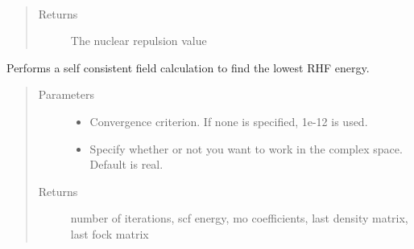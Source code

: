 \documentclass[letterpaper,10pt,english]{sphinxmanual}
\begin{document}
\begin{fulllineitems}
\begin{fulllineitems}
\begin{quote}
\begin{description}
\end{description}\end{quote}

\end{fulllineitems}


\begin{fulllineitems}
\label{\detokenize{RHF:hf.HartreeFock.RHF.MF.nuc_rep}}~\begin{quote}\begin{description}
\item[{Returns}] \leavevmode
The nuclear repulsion value

\end{description}\end{quote}

\end{fulllineitems}


\begin{fulllineitems}
\label{\detokenize{RHF:hf.HartreeFock.RHF.MF.scf}}
Performs a self consistent field calculation to find the lowest RHF energy.
\begin{quote}\begin{description}
\item[{Parameters}] \leavevmode\begin{itemize}
\item {} 
 \textendash{} Convergence criterion. If none is specified, 1e-12 is used.

\item {} 
 \textendash{} Specify whether or not you want to work in the complex space. Default is real.

\end{itemize}

\item[{Returns}] \leavevmode
number of iterations, scf energy, mo coefficients, last density matrix, last fock matrix

\end{description}\end{quote}

\end{fulllineitems}


\end{fulllineitems}
\end{document}
